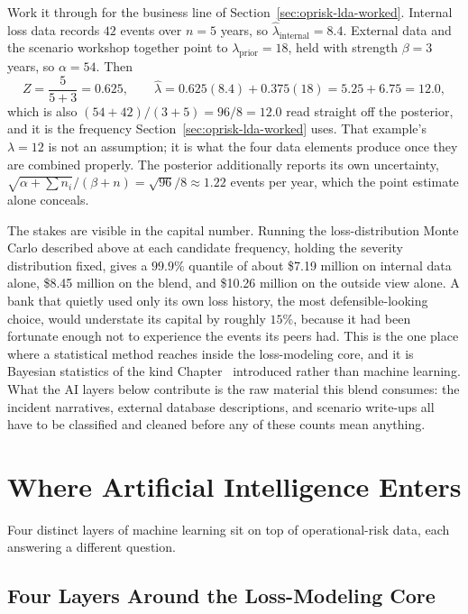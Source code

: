 \documentclass[../ai_in_finance]{subfiles}
\begin{document}
Work it through for the business line of Section~\ref{sec:oprisk-lda-worked}. Internal loss data records $42$ events over $n=5$ years, so $\hat\lambda_{\text{internal}} = 8.4$. External data and the scenario workshop together point to $\lambda_{\text{prior}} = 18$, held with strength $\beta = 3$ years, so $\alpha = 54$. Then
\begin{equation*}
Z = \frac{5}{5+3} = 0.625, \qquad
\hat\lambda = 0.625(8.4) + 0.375(18) = 5.25 + 6.75 = 12.0,
\end{equation*}
which is also $(54+42)/(3+5) = 96/8 = 12.0$ read straight off the posterior, and it is the frequency Section~\ref{sec:oprisk-lda-worked} uses. That example's $\lambda = 12$ is not an assumption; it is what the four data elements produce once they are combined properly. The posterior additionally reports its own uncertainty, $\sqrt{\alpha+\sum n_i}/(\beta+n) = \sqrt{96}/8 \approx 1.22$ events per year, which the point estimate alone conceals.

The stakes are visible in the capital number. Running the loss-distribution Monte Carlo described above at each candidate frequency, holding the severity distribution fixed, gives a $99.9\%$ quantile of about \$7.19 million on internal data alone, \$8.45 million on the blend, and \$10.26 million on the outside view alone. A bank that quietly used only its own loss history, the most defensible-looking choice, would understate its capital by roughly $15\%$, because it had been fortunate enough not to experience the events its peers had. This is the one place where a statistical method reaches inside the loss-modeling core, and it is Bayesian statistics of the kind Chapter~ introduced rather than machine learning. What the AI layers below contribute is the raw material this blend consumes: the incident narratives, external database descriptions, and scenario write-ups all have to be classified and cleaned before any of these counts mean anything.

\section{Where Artificial Intelligence Enters}

Four distinct layers of machine learning sit on top of operational-risk data, each answering a different question.

\subsection{Four Layers Around the Loss-Modeling Core}
\label{sec:oprisk-ai-layers}
\end{document}
